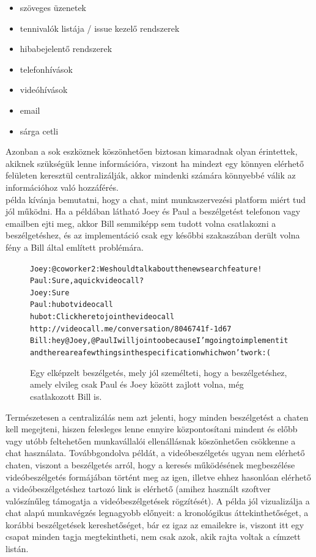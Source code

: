 \begin{itemize}
  \item szöveges üzenetek
  \item tennivalók listája / issue kezelő rendszerek
  \item hibabejelentő rendszerek
  \item telefonhívások
  \item videóhívások
  \item email
  \item sárga cetli
\end{itemize}

Azonban a sok eszköznek köszönhetően biztosan kimaradnak olyan érintettek, akiknek szükségük lenne információra, viszont ha mindezt egy könnyen elérhető felületen keresztül centralizálják, akkor mindenki számára könnyebbé válik az információhoz való hozzáférés.\\
 példa kívánja bemutatni, hogy a chat, mint munkaszervezési platform miért tud jól működni. Ha a példában látható Joey és Paul a beszélgetést telefonon vagy emailben ejti meg, akkor Bill semmiképp sem tudott volna csatlakozni a beszélgetéshez, és az implementáció csak egy későbbi szakaszában derült volna fény a Bill által említett problémára.

\begin{figure}[H]
  \begin{alltt}
Joey: @coworker2: We should talk about the new search feature!
Paul: Sure, a quick videocall?
Joey: Sure
Paul: hubot videocall
hubot: Click here to join the video call
       http://videocall.me/conversation/8046741f-1d67
Bill: hey @Joey, @Paul I will join too because I'm going to implement it 
      and there are a few things in the specification which won't work :(
  \end{alltt}
  \caption[DUMMY]%
    {Egy elképzelt beszélgetés, mely jól személteti, hogy a beszélgetéshez, amely elvileg csak Paul és Joey között zajlott volna, még csatlakozott Bill is.}%
    \label{lst:search_feature_call}
\end{figure}

Természetesen a centralizálás nem azt jelenti, hogy minden beszélgetést a chaten kell megejteni, hiszen felesleges lenne ennyire központosítani mindent és előbb vagy utóbb feltehetően munkavállalói ellenállásnak köszönhetően csökkenne a chat használata. Továbbgondolva  példát, a videóbeszélgetés ugyan nem elérhető chaten, viszont a beszélgetés arról, hogy a keresés működésének megbeszélése videóbeszélgetés formájában történt meg az igen, illetve ehhez hasonlóan elérhető a videóbeszélgetéshez tartozó link is elérhető (amihez használt szoftver valószínűleg támogatja a videóbeszélgetések rögzítését). A példa jól vizualizálja a chat alapú munkavégzés legnagyobb előnyeit: a kronológikus áttekinthetőséget, a korábbi beszélgetések kereshetőséget, bár ez igaz az emailekre is, viszont itt egy csapat minden tagja megtekintheti, nem csak azok, akik rajta voltak a címzett listán.\\

